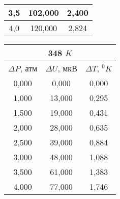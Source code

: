 \documentclass[a4paper, 12pt]{article}
\begin{document}
\begin{enumerate}
\begin{table}[ht!]
\begin{tabular}{|c|c|c|}
        3,5             & 102,000         & 2,400             \\ \hline
        4,0             & 120,000         & 2,824             \\ \hline
        \end{tabular}
    \end{table}
    \begin{table}[ht!]
        \begin{tabular}{|c|c|c|}
        \hline
        \multicolumn{3}{|c|}{348 $K$}                           \\ \hline
        $\Delta P$, атм & $\Delta U$, мкВ & $\Delta T$, $^{0}K$ \\ \hline
        0,000           & 0,000           & 0,000               \\ \hline
        1,000           & 13,000          & 0,295               \\ \hline
        1,500           & 19,000          & 0,431               \\ \hline
        2,000           & 28,000          & 0,635               \\ \hline
        2,500           & 39,000          & 0,884               \\ \hline
        3,000           & 48,000          & 1,088               \\ \hline
        3,500           & 61,000          & 1,383               \\ \hline
        4,000           & 77,000          & 1,746               \\ \hline
        \end{tabular}
    \end{table}
\end{enumerate}
    
\end{document}
